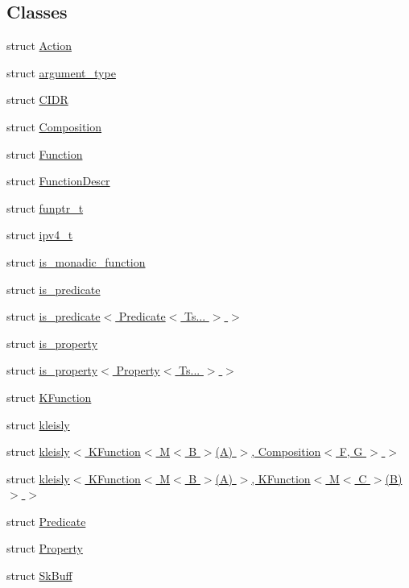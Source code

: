 \subsection*{Classes}
\begin{DoxyCompactItemize}
\item 
struct \hyperlink{structpfq_1_1lang_1_1Action}{Action}
\item 
struct \hyperlink{structpfq_1_1lang_1_1argument__type}{argument\+\_\+type}
\item 
struct \hyperlink{structpfq_1_1lang_1_1CIDR}{C\+I\+DR}
\item 
struct \hyperlink{structpfq_1_1lang_1_1Composition}{Composition}
\item 
struct \hyperlink{structpfq_1_1lang_1_1Function}{Function}
\item 
struct \hyperlink{structpfq_1_1lang_1_1FunctionDescr}{Function\+Descr}
\item 
struct \hyperlink{structpfq_1_1lang_1_1funptr__t}{funptr\+\_\+t}
\item 
struct \hyperlink{structpfq_1_1lang_1_1ipv4__t}{ipv4\+\_\+t}
\item 
struct \hyperlink{structpfq_1_1lang_1_1is__monadic__function}{is\+\_\+monadic\+\_\+function}
\item 
struct \hyperlink{structpfq_1_1lang_1_1is__predicate}{is\+\_\+predicate}
\item 
struct \hyperlink{structpfq_1_1lang_1_1is__predicate_3_01Predicate_3_01Ts_8_8_8_01_4_01_4}{is\+\_\+predicate$<$ Predicate$<$ Ts... $>$ $>$}
\item 
struct \hyperlink{structpfq_1_1lang_1_1is__property}{is\+\_\+property}
\item 
struct \hyperlink{structpfq_1_1lang_1_1is__property_3_01Property_3_01Ts_8_8_8_01_4_01_4}{is\+\_\+property$<$ Property$<$ Ts... $>$ $>$}
\item 
struct \hyperlink{structpfq_1_1lang_1_1KFunction}{K\+Function}
\item 
struct \hyperlink{structpfq_1_1lang_1_1kleisly}{kleisly}
\item 
struct \hyperlink{structpfq_1_1lang_1_1kleisly_3_01KFunction_3_01M_3_01B_01_4_07A_08_01_4_00_01Composition_3_01F_00_01G_01_4_01_4}{kleisly$<$ K\+Function$<$ M$<$ B $>$(\+A) $>$, Composition$<$ F, G $>$ $>$}
\item 
struct \hyperlink{structpfq_1_1lang_1_1kleisly_3_01KFunction_3_01M_3_01B_01_4_07A_08_01_4_00_01KFunction_3_01M_3_01C_01_4_07B_08_4_01_4}{kleisly$<$ K\+Function$<$ M$<$ B $>$(\+A) $>$, K\+Function$<$ M$<$ C $>$(\+B)$>$ $>$}
\item 
struct \hyperlink{structpfq_1_1lang_1_1Predicate}{Predicate}
\item 
struct \hyperlink{structpfq_1_1lang_1_1Property}{Property}
\item 
struct \hyperlink{structpfq_1_1lang_1_1SkBuff}{Sk\+Buff}
\end{DoxyCompactItemize}
